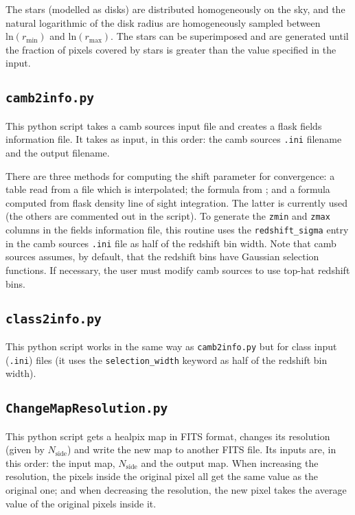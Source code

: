 \documentclass[12pt]{book} %
\newcommand{\nv}[1]{\mathrm{#1}}                 %
\begin{document}
The stars (modelled as disks) are distributed homogeneously on the sky, and the natural 
logarithmic of the disk radius are homogeneously sampled between $\nv{ln}(r_{\nv{min}})$ and 
$\nv{ln}(r_{\nv{max}})$. The stars can be superimposed and are generated until the fraction of 
pixels covered by stars is greater than the value specified in the input.

\subsection{{\tt camb2info.py}}
\label{sec:camb2info}

This {\sc python} script takes a {\sc camb sources} input file and creates a 
{\sc flask} fields information file. It takes as input, in this order: 
the {\sc camb sources} {\tt .ini} filename and the output filename. 

There are three methods for computing the shift parameter for convergence:
a table read from a file which is interpolated; the formula from 
\citet{Hilbert11x}; and a formula computed from {\sc flask} 
density line of sight integration. The latter is currently used (the others 
are commented out in the script). To generate the {\tt zmin} and {\tt zmax} 
columns in the fields information file, this routine uses the {\tt redshift\_sigma} 
entry in the {\sc camb sources} {\tt .ini} file as half of the redshift bin width. 
Note that {\sc camb sources} assumes, by default, that the redshift bins have Gaussian selection 
functions. If necessary, the user must modify {\sc camb sources} to use 
top-hat redshift bins.

\subsection{{\tt class2info.py}}
\label{sec:class2info}

This {\sc python} script works in the same way as {\tt camb2info.py} but 
for {\sc class} input ({\tt .ini}) files (it uses the {\tt selection\_width} 
keyword as half of the redshift bin width).

\subsection{{\tt ChangeMapResolution.py}}
\label{sec:map-res}

This {\sc python} script gets a {\sc healpix} map in FITS format, changes its 
resolution (given by $N_{\nv{side}}$) and write the new map 
to another FITS file. Its inputs are, in this order: the input map, $N_{\nv{side}}$ 
and the output map. When increasing the resolution, the pixels inside the original 
pixel all get the same value as the original one; and when decreasing the resolution, the new pixel takes 
the average value of the original pixels inside it. 
\end{document}
